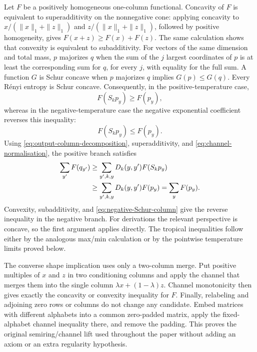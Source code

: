 \documentclass[aps,pra,11pt,onecolumn,nofootinbib,tightenlines]{revtex4-2}
\theoremstyle{definition}
\begin{document}
Let $F$ be a positively homogeneous one-column functional. Concavity of $F$
is equivalent to superadditivity on the nonnegative cone: applying concavity
to $x/(\|x\|_1+\|z\|_1)$ and $z/(\|x\|_1+\|z\|_1)$, followed by positive
homogeneity, gives $F(x+z)\geq F(x)+F(z)$. The same calculation shows that
convexity is equivalent to subadditivity. For vectors of the same dimension
and total mass, $p$
majorizes $q$ when the sum of the $j$ largest coordinates of $p$ is at least
the corresponding sum for $q$, for every $j$, with equality for the full sum.
A function $G$ is Schur concave when $p$ majorizes $q$ implies
$G(p)\leq G(q)$.
Every R\'enyi entropy is Schur concave. Consequently, in the positive-temperature case,
\begin{equation}
 F(S_kp_y)\geq F(p_y),
 \label{eq:positive-Schur-column}
\end{equation}
whereas in the negative-temperature case the negative exponential coefficient
reverses this inequality:
\begin{equation}
 F(S_kp_y)\leq F(p_y).
 \label{eq:negative-Schur-column}
\end{equation}
Using \eqref{eq:output-column-decomposition}, superadditivity, and
\eqref{eq:channel-normalisation}, the positive branch satisfies
\begin{align}
 \sum_{y'}F(q_{y'})
 &\geq\sum_{y',k,y}D_k(y,y')F(S_kp_y)\notag\\
 &\geq\sum_{y',k,y}D_k(y,y')F(p_y)
 =\sum_yF(p_y).
 \label{eq:positive-channel-lift}
\end{align}
Convexity, subadditivity, and \eqref{eq:negative-Schur-column} give the reverse
inequality in the negative branch. For derivations the relevant perspective is
concave, so the first argument applies directly. The tropical inequalities
follow either by the analogous max/min calculation or by the pointwise
temperature limits proved below.

The converse shape implication uses only a two-column merge. Put positive
multiples of $x$ and $z$ in two conditioning columns and apply the channel
that merges them into the single column $\lambda x+(1-\lambda)z$. Channel
monotonicity then gives exactly the concavity or convexity inequality for $F$.
Finally, relabeling and adjoining zero rows or columns do not change any
candidate. Embed matrices with different alphabets into a common zero-padded
matrix, apply the fixed-alphabet channel inequality there, and remove the
padding. This proves the original semiring/channel lift used throughout the
paper without adding an axiom or an extra regularity hypothesis.
\end{document}
